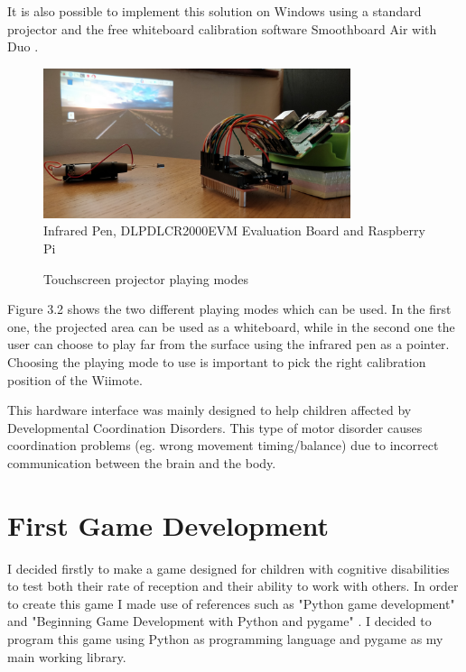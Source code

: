 It is also possible to implement this solution on Windows using a standard projector and the free whiteboard calibration software Smoothboard Air with Duo \cite{smooth}. 

\begin{figure}[ht!]%
    \centering
    \includegraphics[width=9cm]{images/Projector.jpg}%
    \caption{Infrared Pen, DLPDLCR2000EVM Evaluation Board and Raspberry Pi}%
\end{figure}

\begin{figure}[ht!]%
    \centering
    \qquad
    \caption{Touchscreen projector playing modes}%
    \label{fig:example}%
\end{figure}

Figure 3.2 shows the two different playing modes which can be used. In the first one, the projected area can be used as a whiteboard, while in the second one the user can choose to play far from the surface using the infrared pen as a pointer. Choosing the playing mode to use is important to pick the right calibration position of the Wiimote.

This hardware interface was mainly designed to help children affected by Developmental Coordination Disorders. This type of motor disorder causes coordination problems (eg. wrong movement timing/balance) due to incorrect communication between the brain and the body. 

\section{First Game Development}
I decided firstly to make a game designed for children with cognitive disabilities to test both their rate of reception and their ability to work with others. In order to create this game I made use of references such as "Python game development" \cite{game1} and "Beginning Game Development with Python and pygame" \cite{game2}. I decided to program this game using Python as programming language and pygame as my main working library. 

